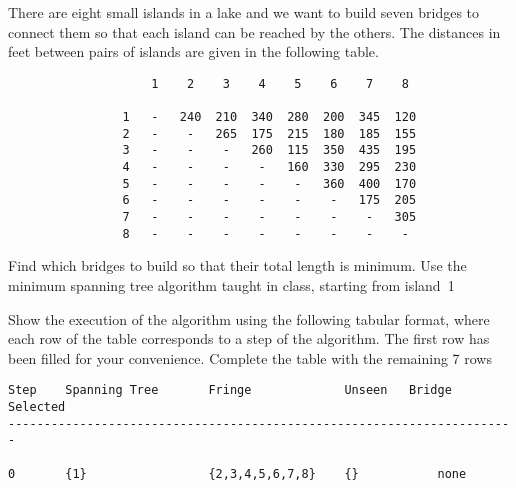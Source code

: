 There are eight small islands in a lake and we want to build seven
bridges to connect them so that each island can be reached by the
others.  The distances in feet between pairs of islands are given in
the following table.

\begin{verbatim}
                    1    2    3    4    5    6    7    8

                1   -   240  210  340  280  200  345  120
                2   -    -   265  175  215  180  185  155
                3   -    -    -   260  115  350  435  195
                4   -    -    -    -   160  330  295  230
                5   -    -    -    -    -   360  400  170
                6   -    -    -    -    -    -   175  205
                7   -    -    -    -    -    -    -   305
                8   -    -    -    -    -    -    -    - 
\end{verbatim}

Find which bridges to build so that their total length is minimum.
Use the minimum spanning tree algorithm taught in class, starting from
island~1

Show the execution of the algorithm using the following tabular
format, where each row of the table corresponds to a step of the
algorithm.  The first row has been filled for your convenience.
Complete the table with the remaining 7 rows

\begin{verbatim}
Step    Spanning Tree       Fringe             Unseen   Bridge Selected
-----------------------------------------------------------------------

0       {1}                 {2,3,4,5,6,7,8}    {}           none
\end{verbatim}
